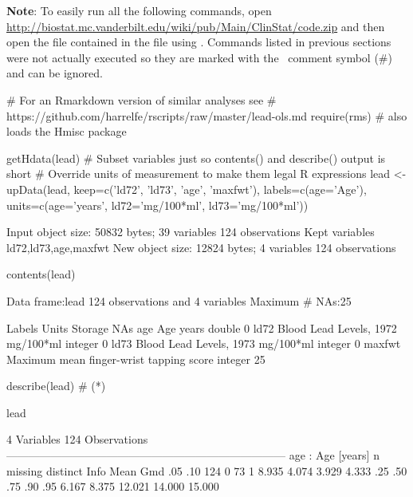 \textbf{Note}: To easily run all the following commands, open \ipacue
\url{http://biostat.mc.vanderbilt.edu/wiki/pub/Main/ClinStat/code.zip}
and then open the file  contained in the 
file using .  Commands listed in previous sections were
not actually executed so they are marked with the \R\ comment symbol
(\#) and can be ignored.

\begin{Schunk}
\begin{Sinput}
# For an Rmarkdown version of similar analyses see
# https://github.com/harrelfe/rscripts/raw/master/lead-ols.md
require(rms)    # also loads the Hmisc package
\end{Sinput}
\begin{Sinput}
getHdata(lead)
# Subset variables just so contents() and describe() output is short
# Override units of measurement to make them legal R expressions
lead <- upData(lead,
               keep=c('ld72', 'ld73', 'age', 'maxfwt'),
               labels=c(age='Age'),
               units=c(age='years', ld72='mg/100*ml', ld73='mg/100*ml'))
\end{Sinput}
\begin{Soutput}
Input object size:	 50832 bytes;	 39 variables	 124 observations
Kept variables	ld72,ld73,age,maxfwt
New object size:	12824 bytes;	4 variables	124 observations
\end{Soutput}
\begin{Sinput}
contents(lead)
\end{Sinput}
\begin{Soutput}

Data frame:lead	124 observations and 4 variables    Maximum # NAs:25


                                        Labels     Units Storage NAs
age                                        Age     years  double   0
ld72                   Blood Lead Levels, 1972 mg/100*ml integer   0
ld73                   Blood Lead Levels, 1973 mg/100*ml integer   0
maxfwt Maximum mean finger-wrist tapping score           integer  25
\end{Soutput}
\begin{Sinput}
describe(lead)   # (*\ipacue*)
\end{Sinput}
\begin{Soutput}
lead 

 4  Variables      124  Observations
---------------------------------------------------------------------------
age : Age [years] 
       n  missing distinct     Info     Mean      Gmd      .05      .10 
     124        0       73        1    8.935    4.074    3.929    4.333 
     .25      .50      .75      .90      .95 
   6.167    8.375   12.021   14.000   15.000 


\end{Soutput}
\end{Schunk}
